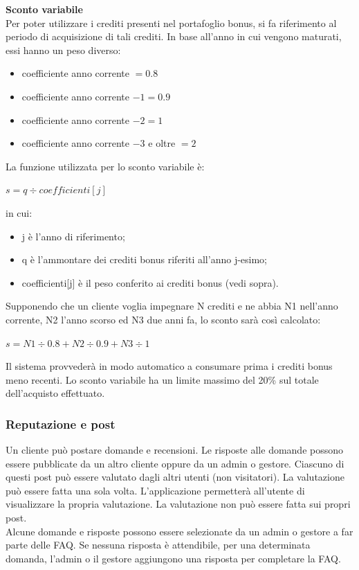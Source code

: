 \documentclass[a4paper, 14pt]{article}
\begin{document}
\begin{flushleft}
				\bigskip \textbf{Sconto variabile} \\ \smallskip
				Per poter utilizzare i crediti presenti nel portafoglio bonus, si fa riferimento
				al periodo di acquisizione di tali crediti. In base all’anno in cui vengono maturati, essi hanno
				un peso diverso:
				\begin{itemize}
					\item coefficiente anno corrente $ = 0.8 $
					\item coefficiente anno corrente $ - 1 = 0.9 $
					\item coefficiente anno corrente $ - 2 = 1 $
					\item coefficiente anno corrente $ - 3 $ e oltre $ = 2 $
				\end{itemize}
				La funzione utilizzata per lo sconto variabile è: \\
				 \begin{center}
				 	$ s = q \div coefficienti[j] $
				 \end{center}
				\newpage in cui:
				\begin{itemize}
					\item j è l’anno di riferimento;
					\item q è l’ammontare dei crediti bonus riferiti all’anno j-esimo;
					\item coefficienti[j] è il peso conferito ai crediti bonus (vedi sopra).
				\end{itemize}

				Supponendo che un cliente voglia impegnare N crediti e ne abbia N1 nell'anno corrente, N2
				l'anno scorso ed N3 due anni fa, lo sconto sarà così calcolato: 
				\begin{center}
					$ s = N1\div0.8 + N2\div0.9 + N3\div1 $\\
				\end{center}
				Il sistema provvederà in modo automatico a consumare prima i crediti bonus meno recenti.
				Lo sconto variabile ha un limite massimo del 20\% sul totale dell'acquisto effettuato.
				
			\subsubsection{Reputazione e post}
				Un cliente può postare domande e recensioni. Le risposte alle domande possono essere pubblicate da un altro cliente oppure
				da un admin o gestore.
				Ciascuno di questi post può essere valutato dagli altri utenti (non visitatori).
				La valutazione può essere fatta una sola volta. L'applicazione permetterà all'utente di visualizzare la propria valutazione.
				La valutazione non può essere fatta sui propri post.\\
				Alcune domande e risposte possono essere selezionate da un admin o gestore a far parte delle FAQ.
				Se nessuna risposta è attendibile, per una determinata domanda, l'admin o il gestore aggiungono una risposta per completare la FAQ.
				

\end{flushleft}
\end{document}
